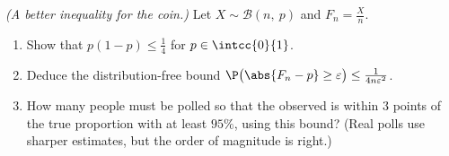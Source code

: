 \begin{exercise}[$\star\star\star$]\label{exo:g12:sums:8}
\emph{(A better inequality for the coin.)} Let
$X \sim \mathcal B(n,\ p)$ and $F_n = \frac Xn$.
\begin{enumerate}
  \item Show that $p(1-p) \leq \frac14$ for $p \in \intcc{0}{1}$.
  \item Deduce the distribution-free bound
        $\P\bigl(\abs{F_n - p} \geq \varepsilon\bigr) \leq
        \frac{1}{4n\varepsilon^2}$.
  \item How many people must be polled so that the observed  is
        within $3$ points of the true proportion with  at least
        $95\%$, using this bound? (Real polls use sharper estimates, but
        the order of magnitude is right.)
\end{enumerate}
\end{exercise}
